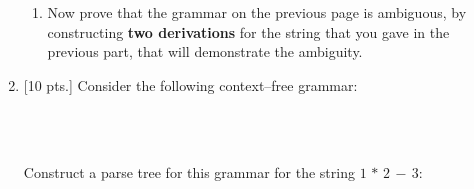 \documentclass[11pt]{article}
\begin{document}
\begin{enumerate}
\begin{enumerate}
            \item Now prove that the grammar on the previous page is
                  ambiguous, by constructing \textbf{two derivations} for
                  the string that you gave in the previous part, that will
                  demonstrate the ambiguity.

          \end{enumerate}

          \vspace{70mm}

    \item {[10 pts.]} Consider the following context--free grammar:
          \begin{grammar}[1.25]

              \\

              \\

          \end{grammar}

          \medskip

          Construct a parse tree for this grammar for the string $1 \, * \,
          2 \, - \, 3$:

  \end{enumerate}
\end{document}
